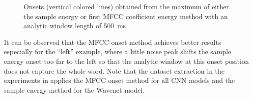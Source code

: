 \begin{figure}[!ht]
  \centering
  \caption{Onsets (vertical colored lines) obtained from the maximum of either the sample energy or first MFCC coefficient energy method with an analytic window length of \SI{500}{\milli\second}.}
  \label{fig:signal_onset_showcase}
\end{figure}
\FloatBarrier
\noindent
It can be observed that the MFCC onset method achieves better results especially for the \enquote{left} example, where a little noise peak shifts the sample energy onset too far to the left so that the analytic window at this onset position does not capture the whole word.
Note that the dataset extraction in the experiments in  applies the MFCC onset method for all CNN models and the sample energy method for the Wavenet model.


